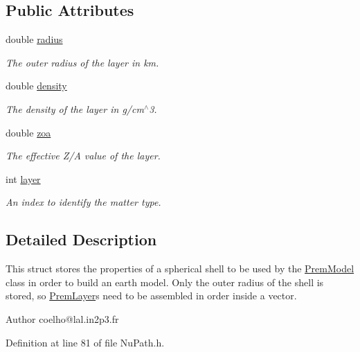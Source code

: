 \subsection*{Public Attributes}
\begin{DoxyCompactItemize}
\item 
double \hyperlink{structOscProb_1_1PremLayer_a39b409c20fd96a7a0bd421567c00ffed}{radius}
\begin{DoxyCompactList}\small\item\em The outer radius of the layer in km. \end{DoxyCompactList}\item 
double \hyperlink{structOscProb_1_1PremLayer_aba2536cbdab87d0db33df47f95c4f2c3}{density}
\begin{DoxyCompactList}\small\item\em The density of the layer in g/cm$^\wedge$3. \end{DoxyCompactList}\item 
double \hyperlink{structOscProb_1_1PremLayer_a8687a8169d786fca79908292d11077f5}{zoa}
\begin{DoxyCompactList}\small\item\em The effective Z/A value of the layer. \end{DoxyCompactList}\item 
int \hyperlink{structOscProb_1_1PremLayer_aca8d7df68e6f982155b68b7e6a7ef389}{layer}
\begin{DoxyCompactList}\small\item\em An index to identify the matter type. \end{DoxyCompactList}\end{DoxyCompactItemize}


\subsection{Detailed Description}
This struct stores the properties of a spherical shell to be used by the \hyperlink{classOscProb_1_1PremModel}{Prem\+Model} class in order to build an earth model. Only the outer radius of the shell is stored, so \hyperlink{structOscProb_1_1PremLayer}{Prem\+Layer}\textquotesingle{}s need to be assembled in order inside a vector.

\begin{DoxyAuthor}{Author}
coelho@lal.\+in2p3.\+fr 
\end{DoxyAuthor}


Definition at line 81 of file Nu\+Path.\+h.



